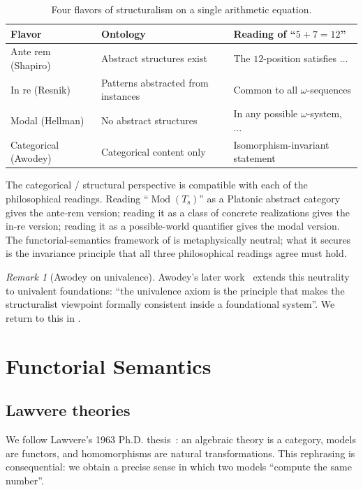 \documentclass[12pt]{article}
\theoremstyle{definition}
\theoremstyle{remark}
\newtheorem{remark}[theorem]{Remark}
\newcommand{\Mod}[1]{\operatorname{Mod}(#1)}
\newcommand{\succop}{\mathrm{s}}
\begin{document}
\begin{table}[ht]
\centering
\small
\begin{tabular}{lll}
\hline
\textbf{Flavor} & \textbf{Ontology} & \textbf{Reading of ``$5 + 7 = 12$''} \\
\hline
Ante rem (Shapiro) & Abstract structures exist & The $12$-position satisfies $\dots$ \\
In re (Resnik) & Patterns abstracted from instances & Common to all $\omega$-sequences \\
Modal (Hellman) & No abstract structures & In any possible $\omega$-system, $\dots$ \\
Categorical (Awodey) & Categorical content only & Isomorphism-invariant statement \\
\hline
\end{tabular}
\caption{Four flavors of structuralism on a single arithmetic equation.}
\label{tab:flavors}
\end{table}

The categorical / structural perspective is compatible with each of the philosophical readings. Reading ``$\Mod{T_\succop}$'' as a Platonic abstract category gives the ante-rem version; reading it as a class of concrete realizations gives the in-re version; reading it as a possible-world quantifier gives the modal version. The functorial-semantics framework of  is metaphysically neutral; what it secures is the invariance principle that all three philosophical readings agree must hold.

\begin{remark}[Awodey on univalence]
Awodey's later work~\cite{Awodey2014} extends this neutrality to univalent foundations: ``the univalence axiom is the principle that makes the structuralist viewpoint formally consistent inside a foundational system''. We return to this in .
\end{remark}

\section{Functorial Semantics}\label{sec:functorial}

\subsection{Lawvere theories}

We follow Lawvere's 1963 Ph.D. thesis~\cite{Lawvere1963}: an algebraic theory is a category, models are functors, and homomorphisms are natural transformations. This rephrasing is consequential: we obtain a precise sense in which two models ``compute the same number''.
\end{document}
